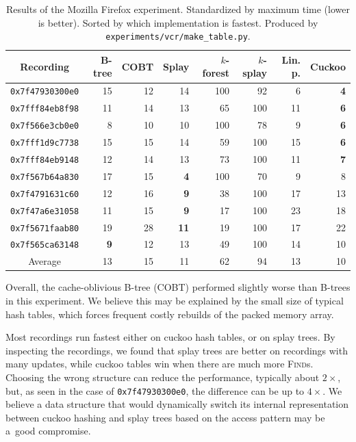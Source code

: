 \begin{table}
\centering
\begin{tabular}{|c|r|r|r|r|r|r|r|}
	\hline
	Recording &
		B-tree & COBT &
		Splay & $k$-forest & $k$-splay &
		Lin. p. & Cuckoo \\
	\hline
	\texttt{0x7f47930300e0} & 15 & 12 & 14 & 100 & 92 & 6 & \textbf{4} \\
	\hline
	\texttt{0x7fff84eb8f98} & 11 & 14 & 13 & 65 & 100 & 11 & \textbf{6} \\
	\hline
	\texttt{0x7f566e3cb0e0} & 8 & 10 & 10 & 100 & 78 & 9 & \textbf{6} \\
	\hline
	\texttt{0x7fff1d9c7738} & 15 & 15 & 14 & 59 & 100 & 15 & \textbf{6} \\
	\hline
	\texttt{0x7fff84eb9148} & 12 & 14 & 13 & 73 & 100 & 11 & \textbf{7} \\
	\hline
	\texttt{0x7f567b64a830} & 17 & 15 & \textbf{4} & 100 & 70 & 9 & 8 \\
	\hline
	\texttt{0x7f4791631c60} & 12 & 16 & \textbf{9} & 38 & 100 & 17 & 13 \\
	\hline
	\texttt{0x7f47a6e31058} & 11 & 15 & \textbf{9} & 17 & 100 & 23 & 18 \\
	\hline
	\texttt{0x7f5671faab80} & 19 & 28 & \textbf{11} & 19 & 100 & 17 & 22 \\
	\hline
	\texttt{0x7f565ca63148} & \textbf{9} & 12 & 13 & 49 & 100 & 14 & 10 \\
	\hline
	\hline
	Average & 13 & 15 & 11 & 62 & 94 & 13 & 10 \\
	\hline
\end{tabular}
\caption{Results of the Mozilla Firefox experiment. Standardized by maximum
	time (lower is better). Sorted by which implementation is fastest.
	Produced by \texttt{experiments/vcr/make\_table.py}.}
\label{tab:firefox-results}
\end{table}

Overall, the cache-oblivious B-tree (COBT) performed slightly worse than
\mbox{B-trees} in this experiment. We believe this may be explained by the
small size of typical hash tables, which forces frequent costly rebuilds of
the packed memory array.

Most recordings run fastest either on cuckoo hash tables, or on splay trees.
By inspecting the recordings, we found that splay trees are better on recordings
with many updates, while cuckoo tables win when there are much more
\textsc{Find}s. Choosing the wrong structure can reduce the performance,
typically about $2\times$, but, as seen in the case of \texttt{0x7f47930300e0},
the difference can be up to $4\times$.
We believe a data structure that would dynamically switch
its internal representation between cuckoo hashing and splay trees
based on the access pattern may be a~good compromise.

